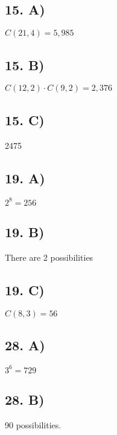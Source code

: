 \documentclass[12]{scrartcl}
\begin{document}
\subsection*{15. A)}
$C(21, 4) = 5,985$
\subsection*{15. B)}
$C(12,2)\cdot C(9, 2)  = 2,376$
\subsection*{15. C)}
2475
\subsection*{19. A)}
$2^8 = 256$
\subsection*{19. B)}
There are 2 possibilities
\subsection*{19. C)}
$C(8,3) = 56$
\subsection*{28. A)}
$3^6 = 729$
\subsection*{28. B)}
90 possibilities. 
\end{document}
